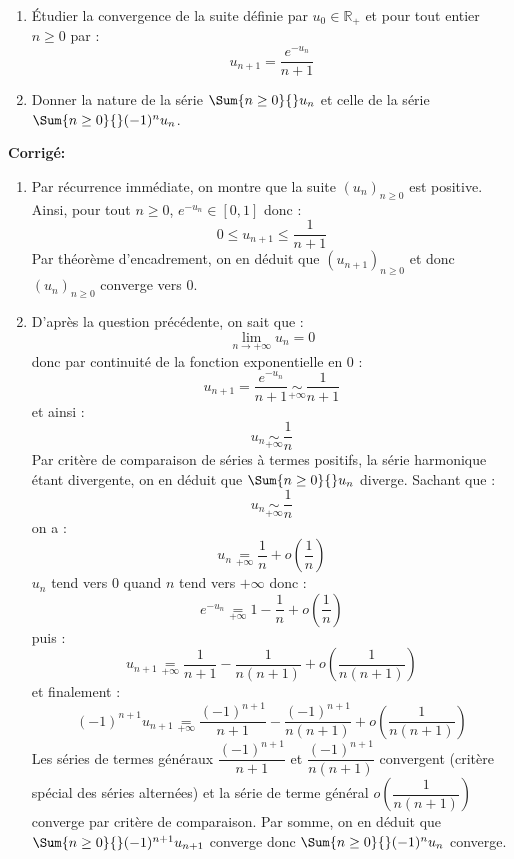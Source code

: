 \documentclass[a4paper,twoside,french,10pt]{VcCours}
\newcommand{\corr}{\textbf{Corrigé:}}
\begin{document}
\medskip

\begin{Exercice}{}  
\begin{enumerate}
\item Étudier la convergence de la suite définie par $u_0 \in \mathbb{R}_+$ et pour tout entier $n \geq 0$ par :
 \[
u_{n + 1} = \frac{e^{ - u_n}}{n + 1}
 \]
\item Donner la nature de la série $\Sum{n \geq 0}{} u_n$ et celle de la série $\Sum{n \geq 0}{} (-1)^n u_n$.
\end{enumerate}
\end{Exercice}

\corr 

\begin{enumerate}
\item Par récurrence immédiate, on montre que la suite $(u_n)_{n \geq 0}$ est positive. Ainsi, pour tout $n \geq 0$, $e^{-u_n} \in [0,1]$ donc :
$$ 0 \leq u_{n+1} \leq \dfrac{1}{n+1}$$
Par théorème d'encadrement, on en déduit que $(u_{n+1})_{n \geq 0}$ et donc $(u_n)_{n \geq 0}$ converge vers $0$.
\item D'après la question précédente, on sait que :
$$ \lim_{n \rightarrow + \infty} u_n = 0$$
donc par continuité de la fonction exponentielle en $0$ :
$$ u_{n+1} = \dfrac{e^{-u_n}}{n+1} \underset{+ \infty}{\sim} \dfrac{1}{n+1}$$
et ainsi :
$$ u_n \underset{+ \infty}{\sim} \dfrac{1}{n}$$
Par critère de comparaison de séries à termes positifs, la série harmonique étant divergente, on en déduit que $\Sum{n \geq 0}{} u_n$ diverge. Sachant que :
$$  u_n \underset{+ \infty}{\sim} \dfrac{1}{n}$$
on a :
$$ u_n \underset{+\infty}{=} \dfrac{1}{n} + o \left( \dfrac{1}{n} \right)$$
$u_n$ tend vers $0$ quand $n$ tend vers $+ \infty$ donc :
$$ e^{-u_n} \underset{+\infty}{=} 1 -\dfrac{1}{n} + o \left( \dfrac{1}{n} \right)$$
puis :
$$ u_{n+1} \underset{+\infty}{=} \dfrac{1}{n+1} - \dfrac{1}{n(n+1)} + o \left( \dfrac{1}{n(n+1)} \right)$$
et finalement :
$$ (-1)^{n+1} u_{n+1} \underset{+\infty}{=} \dfrac{(-1)^{n+1}}{n+1} - \dfrac{(-1)^{n+1}}{n(n+1)} + o \left( \dfrac{1}{n(n+1)} \right)$$
Les séries de termes généraux $\dfrac{(-1)^{n+1}}{n+1}$ et $\dfrac{(-1)^{n+1}}{n(n+1)}$ convergent (critère spécial des séries alternées) et la série de terme général $o \left( \dfrac{1}{n(n+1)} \right)$ converge par critère de comparaison. Par somme, on en déduit que $\Sum{n \geq 0}{} (-1)^{n+1} u_{n+1}$ converge donc $\Sum{n \geq 0}{} (-1)^n u_n$ converge.
\end{enumerate}
\end{document}
